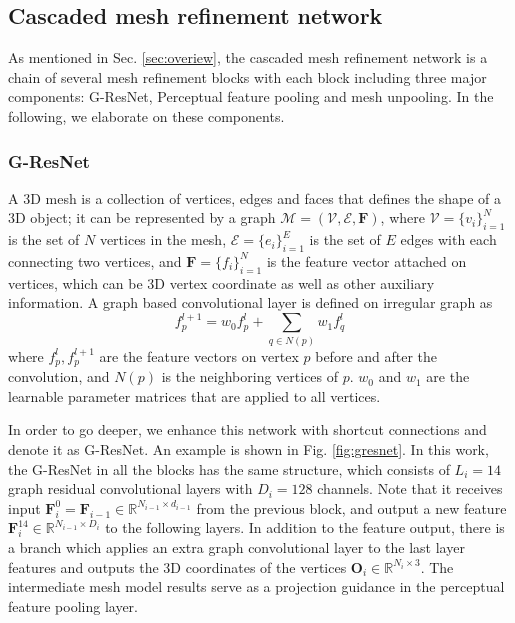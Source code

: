 \documentclass[runningheads]{llncs}
\def\bfF{\mathbf{F}}
\def\bfO{\mathbf{O}}
\def\calE{\mathcal{E}}
\def\calM{\mathcal{M}}
\def\calV{\mathcal{V}}
\def\bbR{\mathbb{R}}
\newcommand{\figref}[1]{Fig. \ref{#1}}
\newcommand{\secref}[1]{Sec. \ref{#1}}
\begin{document}
\subsection{Cascaded mesh refinement network}
\label{sec:cmrn}
As mentioned in \secref{sec:overiew}, the cascaded mesh refinement network is a chain of several mesh refinement blocks with each block including three major components: G-ResNet, Perceptual feature pooling and mesh unpooling. In the following, we elaborate on these components.



\subsubsection{G-ResNet}
A 3D mesh is a collection of vertices, edges and faces that defines the shape of a 3D object; it can be represented by a graph $\calM=(\calV, \calE, \bfF)$, where $\calV=\{v_i\}^{N}_{i=1}$ is the set of $N$ vertices in the mesh, $\calE=\{e_i\}^{E}_{i=1}$ is the set of $E$ edges with each connecting two vertices, and $\bfF=\{f_i\}^{N}_{i=1}$ is the feature vector attached on vertices, which can be 3D vertex coordinate as well as other auxiliary information.
A graph based convolutional layer is defined on irregular graph as
\begin{equation}
f_p^{l+1}= w_0 f_p^l + \sum_{q\in N(p)} w_1 f_q^l 
\end{equation}
where $f_p^l, f_p^{l+1}$ are the feature vectors on vertex $p$ before and after the convolution, and $N(p)$ is the neighboring vertices of $p$. $w_0$ and $w_1$ are the learnable parameter matrices that are applied to all vertices.

In order to go deeper, we enhance this network with shortcut connections \cite{} and denote it as G-ResNet. An example is shown in \figref{fig:gresnet}. In this work, the G-ResNet in all the blocks has the same structure, which consists of $L_i=14$ graph residual convolutional layers with $D_i=128$ channels. Note that it receives input $\bfF^{0}_{i}=\bfF_{i-1}\in\bbR^{N_{i-1}\times d_{i-1}}$ from the previous block, and output a new feature $\bfF^{14}_{i}\in\bbR^{N_{i-1}\times D_i}$ to the following layers. In addition to the feature output, there is a branch which applies an extra graph convolutional layer to the last layer features and outputs the 3D coordinates of the vertices $\bfO_i\in\bbR^{N_i\times 3}$. The intermediate mesh model results serve as a projection guidance in the perceptual feature pooling layer.
\end{document}
